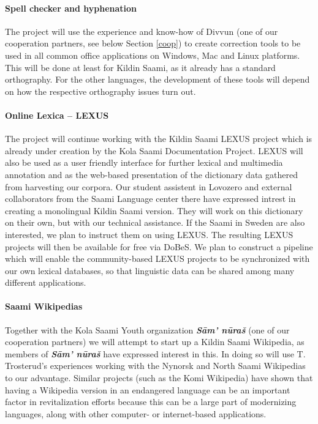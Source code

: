 \documentclass[a4paper,12pt]{article}
\begin{document}
\paragraph{Spell checker and hyphenation} 
The project will use the experience and know-how of Divvun (one of our cooperation partners, see below Section \ref{coop}) to create correction tools to be used in all common office applications on Windows, Mac and Linux platforms. This will be done at least for Kildin Saami, as it already has a standard orthography. For the other languages, the development of these tools will depend on how the respective orthography issues turn out.

\paragraph{Online Lexica – LEXUS}
The project will continue working with the Kildin Saami LEXUS project which is already under creation by the Kola Saami Documentation Project. LEXUS will also be used as a user friendly interface for further lexical and multimedia annotation and as the web-based presentation of the dictionary data gathered from harvesting our corpora. Our student assistent in Lovozero and external collaborators from the Saami Language center there have expressed intrest in creating a monolingual Kildin Saami version. 
They will work on this dictionary on their own, but with our technical assistance. If the Saami in Sweden are also interested, we plan to instruct them on using LEXUS. The resulting LEXUS projects will then be available for free via DoBeS.
We plan to construct a pipeline which will enable the community-based LEXUS projects to be synchronized with our own lexical databases, so that
linguistic data can be shared among many different applications.

\paragraph{Saami Wikipedias}
Together with the Kola Saami Youth organization \textit{\textbf{Sām' nūraš}} (one of our cooperation partners) we will attempt to start up a Kildin Saami Wikipedia, as members of \textit{\textbf{Sām' nūraš}} have expressed interest in this. In doing so will use T.\,Trosterud's experiences working with the Nynorsk and North Saami Wikipedias to our advantage. %
Similar projects (such as the Komi Wikipedia) have shown that having a Wikipedia version in an endangered language can be an important factor in revitalization efforts because this can be a large part of modernizing languages, along with other computer- or internet-based applications. 
\end{document}
